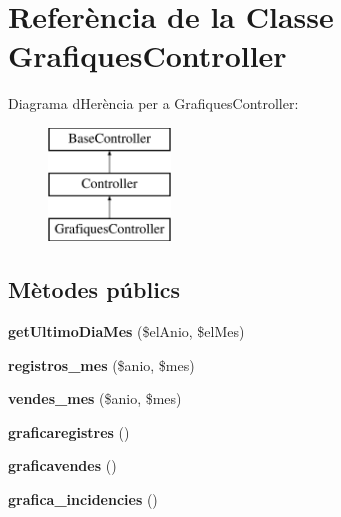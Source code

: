 \hypertarget{class_app_1_1_http_1_1_controllers_1_1_grafiques_controller}{}\section{Referència de la Classe Grafiques\+Controller}
\label{class_app_1_1_http_1_1_controllers_1_1_grafiques_controller}
Diagrama d\textquotesingle{}Herència per a Grafiques\+Controller\+:\begin{figure}[H]
\begin{center}
\leavevmode
\includegraphics[height=3.000000cm]{class_app_1_1_http_1_1_controllers_1_1_grafiques_controller}
\end{center}
\end{figure}
\subsection*{Mètodes públics}
\begin{DoxyCompactItemize}
\item 
\mbox{\label{class_app_1_1_http_1_1_controllers_1_1_grafiques_controller_a4f86f0844a076eb83036bc5795238726}} 
{\bfseries get\+Ultimo\+Dia\+Mes} (\$el\+Anio, \$el\+Mes)
\item 
\mbox{\label{class_app_1_1_http_1_1_controllers_1_1_grafiques_controller_a71653c53cf00b9306b1b2a20ab21bc7c}} 
{\bfseries registros\+\_\+mes} (\$anio, \$mes)
\item 
\mbox{\label{class_app_1_1_http_1_1_controllers_1_1_grafiques_controller_ac25387d618ab6eb8de2ab3114c78aa02}} 
{\bfseries vendes\+\_\+mes} (\$anio, \$mes)
\item 
\mbox{\label{class_app_1_1_http_1_1_controllers_1_1_grafiques_controller_a51e6e99969028f89d31a798e34d9a15e}} 
{\bfseries graficaregistres} ()
\item 
\mbox{\label{class_app_1_1_http_1_1_controllers_1_1_grafiques_controller_a70948041e9500d4eaac8f74ca0e40a51}} 
{\bfseries graficavendes} ()
\item 
\mbox{\label{class_app_1_1_http_1_1_controllers_1_1_grafiques_controller_ab998f25a9179a3f4312a69948aa78e48}} 
{\bfseries grafica\+\_\+incidencies} ()
\end{DoxyCompactItemize}


